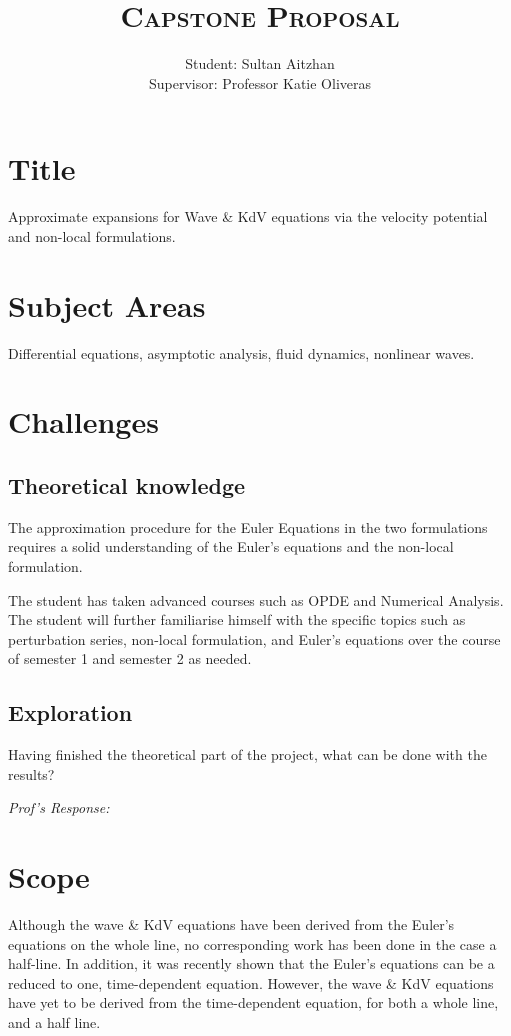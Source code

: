\documentclass[10pt, oneside, a4paper]{article}
\author{
    Student: Sultan Aitzhan\\
    Supervisor: Professor Katie Oliveras
    }
\title{\textsc{Capstone Proposal}}
\date{\vspace{-5ex}}
\begin{document}
\maketitle

\thispagestyle{fancy}


\section{Title}
Approximate expansions for Wave \& KdV equations via the velocity potential and non-local formulations.

\section{Subject Areas}
Differential equations, asymptotic analysis, fluid dynamics, nonlinear waves.

\section{Challenges}
\subsection{Theoretical knowledge}
The approximation procedure for the Euler Equations in the two formulations requires a solid understanding of the Euler's equations and the non-local formulation. 

The student has taken advanced courses such as OPDE and Numerical Analysis. The student will further familiarise himself with the specific topics such as perturbation series, non-local formulation, and Euler's equations over the course of semester 1 and semester 2 as needed.

\subsection{Exploration}
Having finished the theoretical part of the project, what can be done with the results?

\emph{Prof's Response:}

\section{Scope}
Although the wave \& KdV equations have been derived from the Euler's equations on the whole line, no corresponding work has been done in the case a half-line. In addition, it was recently shown that the Euler's equations can be a reduced to one, time-dependent equation. However, the wave \& KdV equations have yet to be derived from the time-dependent equation, for both a whole line, and a half line.
\end{document}
